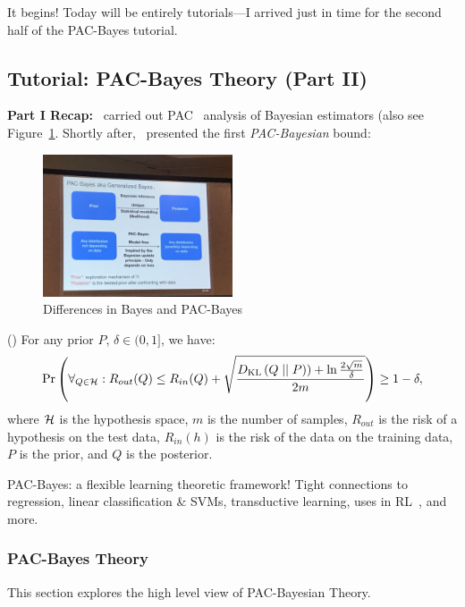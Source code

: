 It begins! Today will be entirely tutorials---I arrived just in time for the second half of the PAC-Bayes tutorial. 

\subsection{Tutorial: PAC-Bayes Theory (Part II)}

{\bf Part I Recap:}~\citet{shawe1997pac} carried out PAC~\cite{valiant1984theory} analysis of Bayesian estimators (also see Figure~\ref{fig:pac_bayes}. Shortly after,~\citet{mcallester1999some} presented the first {\it PAC-Bayesian} bound:

\begin{figure}
    \centering
    \includegraphics[width=0.5\textwidth]{images/pb1.JPG}
    \caption{Differences in Bayes and PAC-Bayes}
    \label{fig:pac_bayes}
\end{figure}


\begin{theorem}
\label{thm:pac_bayes}
(\citet{mcallester1999some}) For any prior $P$, $\delta \in (0,1]$, we have:
\begin{equation}
    \Pr\left(\forall_{Q \in \mathcal{H}} : R_{out}(Q) \leq R_{in}(Q) + \sqrt{\frac{D_{\text{KL}}\left(Q \mid \mid P\right)) + \ln \frac{2 \sqrt{m}}{\delta}}{2m}}\right) \geq 1-\delta,
    \label{eq:pac_bayes}
\end{equation}
where $\mathcal{H}$ is the hypothesis space, $m$ is the number of samples, $R_{out}$ is the risk of a hypothesis on the test data, $R_{in}(h)$ is the risk of the data on the training data, $P$ is the prior, and $Q$ is the posterior.
\end{theorem}

PAC-Bayes: a flexible learning theoretic framework! Tight connections to regression, linear classification \& SVMs, transductive learning, uses in RL~\cite{fard2010pac}, and more.


\subsubsection{PAC-Bayes Theory}
This section explores the high level view of PAC-Bayesian Theory. \\


